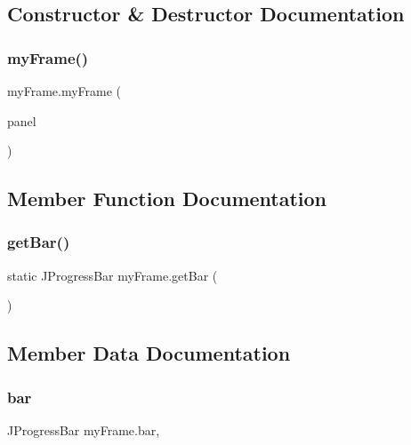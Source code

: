 \subsection{Constructor \& Destructor Documentation}
\hypertarget{classmy_frame_a2b3c0cea5de20595de9c29760f8b69f3}{}\label{classmy_frame_a2b3c0cea5de20595de9c29760f8b69f3} 
\subsubsection{\texorpdfstring{my\+Frame()}{myFrame()}}
{\footnotesize\ttfamily my\+Frame.\+my\+Frame (\begin{DoxyParamCaption}\item[{\hyperlink{classmy_panel}{my\+Panel}}]{panel }\end{DoxyParamCaption})}



\subsection{Member Function Documentation}
\hypertarget{classmy_frame_ab4821a86dfc373a36ef2d654cf81f238}{}\label{classmy_frame_ab4821a86dfc373a36ef2d654cf81f238} 
\subsubsection{\texorpdfstring{get\+Bar()}{getBar()}}
{\footnotesize\ttfamily static J\+Progress\+Bar my\+Frame.\+get\+Bar (\begin{DoxyParamCaption}{ }\end{DoxyParamCaption})\hspace{0.3cm}{\ttfamily [static]}}



\subsection{Member Data Documentation}
\hypertarget{classmy_frame_ae283c7ab04567b1827978486e39a7e95}{}\label{classmy_frame_ae283c7ab04567b1827978486e39a7e95} 
\subsubsection{\texorpdfstring{bar}{bar}}
{\footnotesize\ttfamily J\+Progress\+Bar my\+Frame.\+bar\hspace{0.3cm}{\ttfamily [static]}, {\ttfamily [private]}}

